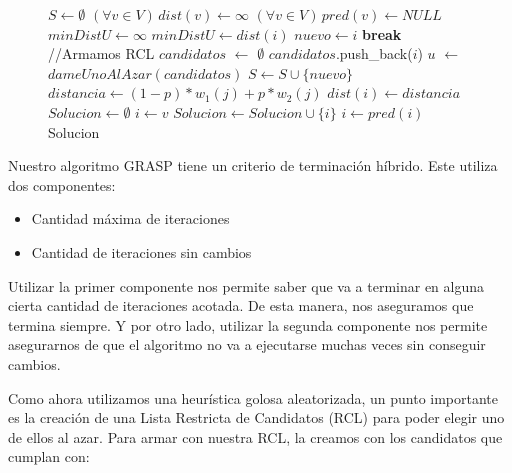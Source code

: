 \begin{center}
 \begin{figure}[H]
  \begin{pseudo}
    \State $S \leftarrow \emptyset$
    \State $(\forall v \in V)\,dist(v) \leftarrow \infty$
    \State $(\forall v \in V)\,pred(v) \leftarrow NULL$
    \State $minDistU \leftarrow \infty$
	\State $minDistU \leftarrow dist(i)$
	\State $nuevo \leftarrow i$
      \EndIf
    \EndFor
      \State \textbf{break}
    \EndIf
    \State //Armamos RCL
    \State $candidatos$ $\leftarrow$ $\emptyset$
	\State $candidatos$.push\_back($i$)
      \EndIf
    \EndFor
    \State $u$ $\leftarrow$ $dameUnoAlAzar(candidatos)$
    \State $S \leftarrow S \cup \{nuevo\}$
      \State $distancia \leftarrow (1-p)*w_1(j) + p*w_2(j)$
	\State $dist(i) \leftarrow distancia$
      \EndIf
    \EndFor
    \EndWhile
    \State $Solucion \leftarrow \emptyset$
    \State $i \leftarrow v$
      \State $Solucion \leftarrow Solucion \cup \{i\}$
      \State $i \leftarrow pred(i)$
    \EndWhile
    \Return Solucion
    \EndProcedure
  \end{pseudo}
 \end{figure}
\end{center}

Nuestro algoritmo GRASP tiene un criterio de terminación híbrido. Este utiliza dos componentes: 

\begin{itemize}
 \item Cantidad máxima de iteraciones
 \item Cantidad de iteraciones sin cambios
\end{itemize}


Utilizar la primer componente nos permite saber que va a terminar en alguna cierta cantidad de iteraciones acotada. De esta manera, nos aseguramos que termina siempre. Y por otro lado, utilizar la segunda componente nos permite asegurarnos de que el algoritmo no va a ejecutarse muchas veces sin conseguir cambios.

Como ahora utilizamos una heurística golosa aleatorizada, un punto importante es la creación de una Lista Restricta de Candidatos (RCL) para poder elegir uno de ellos al azar. Para armar con nuestra RCL, la creamos con los candidatos que cumplan con:

